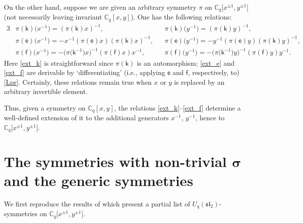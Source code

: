 \documentclass[pdftex]{sigma}
\numberwithin{equation}{section}
\begin{document}
On the other hand, suppose we are given an arbitrary symmetry $\pi$ on
$\mathbb{C}_q\big[x^{\pm 1},y^{\pm 1}\big]$ (not necessarily leaving invariant
$\mathbb{C}_q[x,y]$). One has the following relations:
\begin{alignat}{3}
&\pi(\mathsf{k})\big(x^{-1}\big)=(\pi(\mathsf{k})x)^{-1}, & & \pi(\mathsf{k})\big(y^{-1}\big)=(\pi(\mathsf{k})y)^{-1}, & \label{ext_k}\\
& \pi(\mathsf{e})\big(x^{-1}\big)=-x^{-1}(\pi(\mathsf{e})x)(\pi(\mathsf{k})x)^{-1}, & & \pi(\mathsf{e})\big(y^{-1}\big) =-y^{-1}(\pi(\mathsf{e})y)(\pi(\mathsf{k})y)^{-1}, & \label{ext_e}\\
& \pi(\mathsf{f})\big(x^{-1}\big)=-\big(\pi\big(\mathsf{k}^{-1}\big)x\big)^{-1}(\pi(\mathsf{f})x)x^{-1}, \ \ \, & & \pi(\mathsf{f})\big(y^{-1}\big)=-\big(\pi\big(\mathsf{k}^{-1}\big)y\big)^{-1}(\pi(\mathsf{f})y)y^{-1}.\!\!\!\! &\label{ext_f}
\end{alignat}
Here \eqref{ext_k} is straightforward since $\pi(\mathsf{k})$ is an automorphism; \eqref{ext_e} and \eqref{ext_f} are derivable by `differentiating' (i.e., applying $\mathsf{e}$ and $\mathsf{f}$, respectively, to) \eqref{Lpr}. Certainly, these relations remain true when $x$ or $y$ is replaced by an arbitrary invertible element.

Thus, given a symmetry on $\mathbb{C}_q[x,y]$, the relations \eqref{ext_k}--\eqref{ext_f} determine a well-defined extension of it to the additional generators $x^{-1}$, $y^{-1}$, hence to $\mathbb{C}_q\big[x^{\pm 1},y^{\pm 1}\big]$.

\section[The symmetries with non-trivial $\sigma$ and the generic symmetries]{The symmetries with non-trivial $\boldsymbol{\sigma}$\\ and the generic symmetries}\label{nw}

We first reproduce the results of \cite{S} which present a partial list of $U_q(\mathfrak{sl}_2)$-symmetries on $\mathbb{C}_q\big[x^{\pm 1},y^{\pm 1}\big]$.
\end{document}

